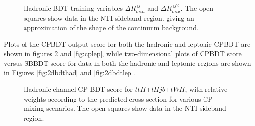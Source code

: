 \begin{figure}[htbp]
  \centering
  \caption{Hadronic BDT training variables $\Delta R_{min}^{\gamma j}$ and $\Delta R_{min}^{\gamma j2}$.  The open squares show data in the NTI sideband region, giving an approximation of the shape of the continuum background. }
  \label{fig:hadvbls7}
\end{figure}

Plots of the CPBDT output score for both the hadronic and leptonic CPBDT are shown in figures \ref{fig:cphad} and \ref{fig:cplep}, while two-dimensional plots of CPBDT score versus SBBDT score for data in both the hadronic and leptonic regions are shown in Figures \ref{fig:2dbdthad} and \ref{fig:2dbdtlep}.

\begin{figure}[htbp]
  \centering
  \caption{Hadronic channel CP BDT score for $ttH$+$tHjb$+$tWH$, with relative weights according to the predicted cross section for various CP mixing scenarios.  The open squares show data in the NTI sideband region. }
  \label{fig:cphad}
\end{figure}

